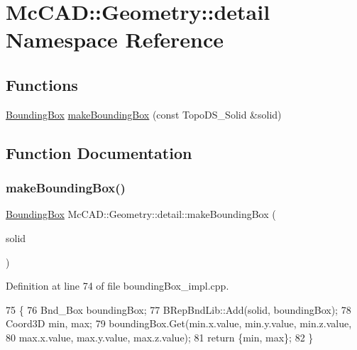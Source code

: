 \hypertarget{namespaceMcCAD_1_1Geometry_1_1detail}{}\section{Mc\+C\+AD\+:\+:Geometry\+:\+:detail Namespace Reference}
\label{namespaceMcCAD_1_1Geometry_1_1detail}
\subsection*{Functions}
\begin{DoxyCompactItemize}
\item 
\hyperlink{classMcCAD_1_1Geometry_1_1BoundingBox}{Bounding\+Box} \hyperlink{namespaceMcCAD_1_1Geometry_1_1detail_a3f1c19867072234af3dd8cca827d75d2}{make\+Bounding\+Box} (const Topo\+D\+S\+\_\+\+Solid \&solid)
\end{DoxyCompactItemize}


\subsection{Function Documentation}
\mbox{\label{namespaceMcCAD_1_1Geometry_1_1detail_a3f1c19867072234af3dd8cca827d75d2}} 
\subsubsection{\texorpdfstring{make\+Bounding\+Box()}{makeBoundingBox()}}
{\footnotesize\ttfamily \hyperlink{classMcCAD_1_1Geometry_1_1BoundingBox}{Bounding\+Box} Mc\+C\+A\+D\+::\+Geometry\+::detail\+::make\+Bounding\+Box (\begin{DoxyParamCaption}\item[{const Topo\+D\+S\+\_\+\+Solid \&}]{solid }\end{DoxyParamCaption})}



Definition at line 74 of file bounding\+Box\+\_\+impl.\+cpp.


\begin{DoxyCode}
75                                   \{
76     Bnd\_Box boundingBox;
77     BRepBndLib::Add(solid, boundingBox);
78     Coord3D min, max;
79     boundingBox.Get(min.x.value, min.y.value, min.z.value,
80                     max.x.value, max.y.value, max.z.value);
81     \textcolor{keywordflow}{return} \{min, max\};
82 \}
\end{DoxyCode}
